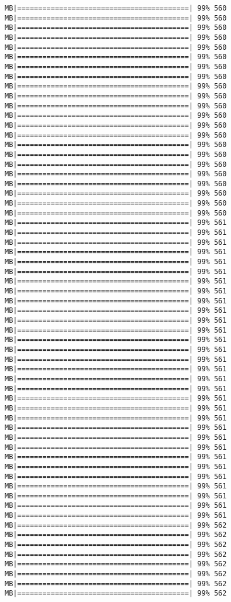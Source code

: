 \documentclass[
]{article}
\begin{document}
\begin{verbatim}
MB|=========================================| 99% 560 MB|=========================================| 99% 560 MB|=========================================| 99% 560 MB|=========================================| 99% 560 MB|=========================================| 99% 560 MB|=========================================| 99% 560 MB|=========================================| 99% 560 MB|=========================================| 99% 560 MB|=========================================| 99% 560 MB|=========================================| 99% 560 MB|=========================================| 99% 560 MB|=========================================| 99% 560 MB|=========================================| 99% 560 MB|=========================================| 99% 560 MB|=========================================| 99% 560 MB|=========================================| 99% 560 MB|=========================================| 99% 560 MB|=========================================| 99% 560 MB|=========================================| 99% 560 MB|=========================================| 99% 560 MB|=========================================| 99% 560 MB|=========================================| 99% 560 MB|=========================================| 99% 561 MB|=========================================| 99% 561 MB|=========================================| 99% 561 MB|=========================================| 99% 561 MB|=========================================| 99% 561 MB|=========================================| 99% 561 MB|=========================================| 99% 561 MB|=========================================| 99% 561 MB|=========================================| 99% 561 MB|=========================================| 99% 561 MB|=========================================| 99% 561 MB|=========================================| 99% 561 MB|=========================================| 99% 561 MB|=========================================| 99% 561 MB|=========================================| 99% 561 MB|=========================================| 99% 561 MB|=========================================| 99% 561 MB|=========================================| 99% 561 MB|=========================================| 99% 561 MB|=========================================| 99% 561 MB|=========================================| 99% 561 MB|=========================================| 99% 561 MB|=========================================| 99% 561 MB|=========================================| 99% 561 MB|=========================================| 99% 561 MB|=========================================| 99% 561 MB|=========================================| 99% 561 MB|=========================================| 99% 561 MB|=========================================| 99% 561 MB|=========================================| 99% 561 MB|=========================================| 99% 561 MB|=========================================| 99% 562 MB|=========================================| 99% 562 MB|=========================================| 99% 562 MB|=========================================| 99% 562 MB|=========================================| 99% 562 MB|=========================================| 99% 562 MB|=========================================| 99% 562 MB|=========================================| 99% 562 
\end{verbatim}
\end{document}

